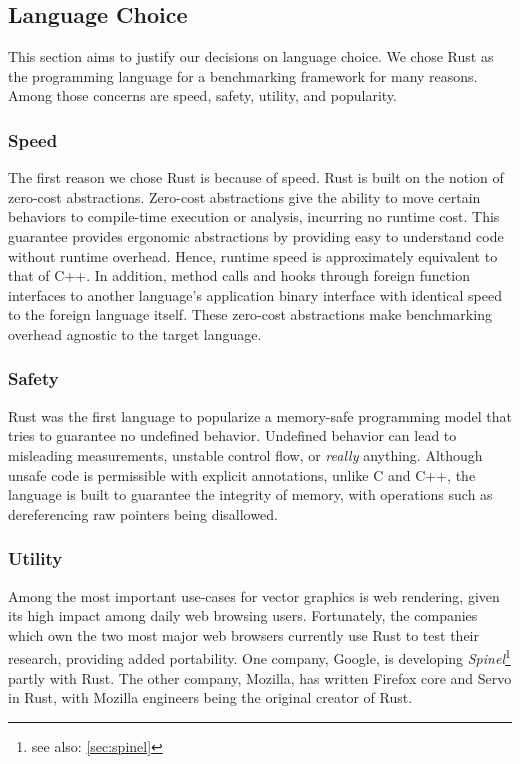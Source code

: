 \subsection{Language Choice}
This section aims to justify our decisions on language choice. We chose Rust as the programming language for a benchmarking framework for many reasons. Among those concerns are speed, safety, utility, and popularity.\medskip

\subsubsection{Speed}
The first reason we chose Rust is because of speed. Rust is built on the notion of zero-cost abstractions. Zero-cost abstractions give the ability to move certain behaviors to compile-time execution or analysis, incurring no runtime cost\cite{Dursun20}. This guarantee provides ergonomic abstractions by providing easy to understand code without runtime overhead. Hence, runtime speed is approximately equivalent to that of C++. In addition, method calls and hooks through foreign function interfaces to another language's application binary interface with identical speed to the foreign language itself\cite{Crichton15}. These zero-cost abstractions make benchmarking overhead agnostic to the target language.

\subsubsection{Safety}
Rust was the first language to popularize a memory-safe programming model that tries to guarantee no undefined behavior. Undefined behavior can lead to misleading measurements, unstable control flow, or \emph{really} anything. Although unsafe code is permissible with explicit annotations, unlike C and C++, the language is built to guarantee the integrity of memory, with operations such as dereferencing raw pointers being disallowed\cite{WhatUnsafeCanDo}.

\subsubsection{Utility}
Among the most important use-cases for vector graphics is web rendering, given its high impact among daily web browsing users. Fortunately, the companies which own the two most major web browsers currently use Rust to test their research, providing added portability. One company, Google, is developing \textit{Spinel}\footnote{see also: \cref{sec:spinel}} partly with Rust. The other company, Mozilla, has written Firefox core and Servo\cite{RustServo} in Rust, with Mozilla engineers being the original creator of Rust\cite{RustFoundation21}.\medskip

